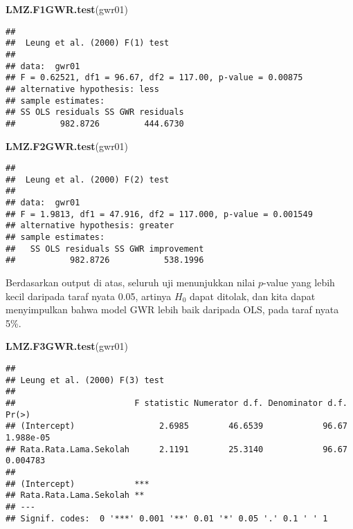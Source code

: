 \documentclass[
]{book}
\newenvironment{Shaded}{\begin{snugshade}}{\end{snugshade}}
\newcommand{\KeywordTok}[1]{\textcolor[rgb]{0.13,0.29,0.53}{\textbf{#1}}}
\newcommand{\NormalTok}[1]{#1}
\begin{document}
\begin{Shaded}
\begin{Highlighting}[]
\KeywordTok{LMZ.F1GWR.test}\NormalTok{(gwr01)}
\end{Highlighting}
\end{Shaded}

\begin{verbatim}
## 
##  Leung et al. (2000) F(1) test
## 
## data:  gwr01
## F = 0.62521, df1 = 96.67, df2 = 117.00, p-value = 0.00875
## alternative hypothesis: less
## sample estimates:
## SS OLS residuals SS GWR residuals 
##         982.8726         444.6730
\end{verbatim}

\begin{Shaded}
\begin{Highlighting}[]
\KeywordTok{LMZ.F2GWR.test}\NormalTok{(gwr01)}
\end{Highlighting}
\end{Shaded}

\begin{verbatim}
## 
##  Leung et al. (2000) F(2) test
## 
## data:  gwr01
## F = 1.9813, df1 = 47.916, df2 = 117.000, p-value = 0.001549
## alternative hypothesis: greater
## sample estimates:
##   SS OLS residuals SS GWR improvement 
##           982.8726           538.1996
\end{verbatim}

Berdasarkan output di atas, seluruh uji menunjukkan nilai \(p\)-value yang lebih kecil daripada taraf nyata 0.05, artinya \(H_0\) dapat ditolak, dan kita dapat menyimpulkan bahwa model GWR lebih baik daripada OLS, pada taraf nyata 5\%.

\begin{Shaded}
\begin{Highlighting}[]
\KeywordTok{LMZ.F3GWR.test}\NormalTok{(gwr01)}
\end{Highlighting}
\end{Shaded}

\begin{verbatim}
## 
## Leung et al. (2000) F(3) test
## 
##                        F statistic Numerator d.f. Denominator d.f.     Pr(>)
## (Intercept)                 2.6985        46.6539            96.67 1.988e-05
## Rata.Rata.Lama.Sekolah      2.1191        25.3140            96.67  0.004783
##                           
## (Intercept)            ***
## Rata.Rata.Lama.Sekolah ** 
## ---
## Signif. codes:  0 '***' 0.001 '**' 0.01 '*' 0.05 '.' 0.1 ' ' 1
\end{verbatim}
\end{document}
